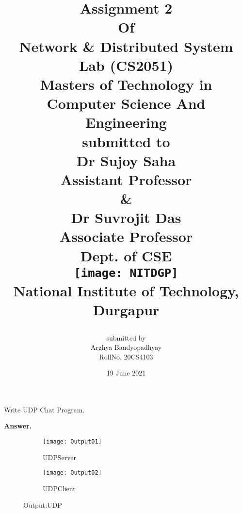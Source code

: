 \documentclass{article}
\author{\Large submitted by\\ Arghya Bandyopadhyay\\
    	RollNo. 20CS4103\\}
\title{\begin{center}
       \bfseries\Large
    	Assignment 2\\
    	Of\\
    	Network \& Distributed System Lab (CS2051)\\
        Masters of Technology in Computer Science And Engineering\\
    	\vskip1cm
    	submitted to\\
    	Dr Sujoy Saha\\
    	Assistant Professor\\
    	\&\\
    	Dr Suvrojit Das\\
    	Associate Professor\\
    	Dept. of CSE\\
    	\vskip1cm
    	\texttt{[image: NITDGP]}\\
    	National Institute of Technology, Durgapur\\
    \end{center}}
\date{19 June 2021}
\begin{document}
\maketitle
\pagebreak

Write UDP Chat Program.
\begin{flushleft}
\textbf{Answer.}
\end{flushleft}


\pagebreak

\pagebreak
\begin{figure}[h]
\begin{subfigure}{.5\textwidth}
\texttt{[image: Output01]}
\caption{UDPServer}
\label{UDPServer}
\end{subfigure}
\begin{subfigure}{.5\textwidth}
\texttt{[image: Output02]}
\caption{UDPClient}
\label{UDPClient}
\end{subfigure}
\caption{Output:UDP}
\label{fig:UDP}
\end{figure}
\end{document}
